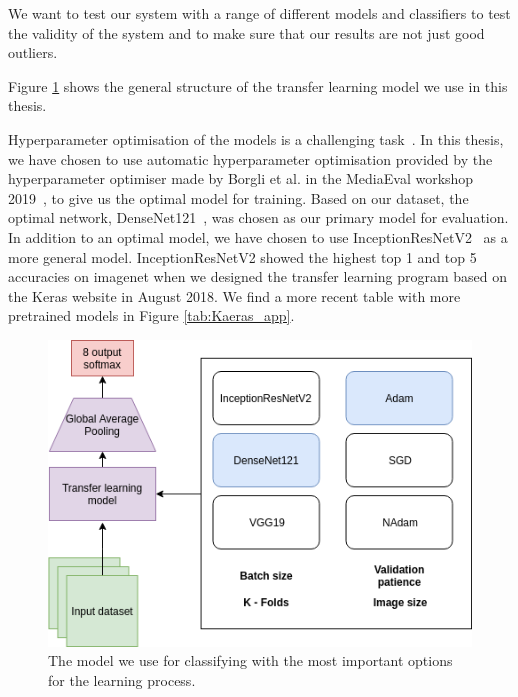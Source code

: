 We want to test our system with a range of different models and classifiers to test the validity of the system and to make sure that our results are not just good outliers.

Figure \ref{fig:KTLmodel} shows the general structure of the transfer learning model we use in this thesis. 

Hyperparameter optimisation of the models is a challenging task~\cite{runeMedico2018}. In this thesis, we have chosen to use automatic hyperparameter optimisation provided by the hyperparameter optimiser made by Borgli et al. in the MediaEval workshop 2019~\cite{runeMedico2018}, to give us the optimal model for training. Based on our dataset, the optimal network, DenseNet121~\cite{DBLP:journals/corr/HuangLW16a}, was chosen as our primary model for evaluation. 
In addition to an optimal model, we have chosen to use InceptionResNetV2~\cite{DBLP:journals/corr/SzegedyIV16} as a more general model. InceptionResNetV2 showed the highest top 1 and top 5 accuracies on imagenet when we designed the transfer learning program based on the Keras website in August 2018. We find a more recent table with more pretrained models in Figure \ref{tab:Kaeras_app}.





\begin{figure}[h]
        \centering
        \includegraphics[scale=0.5]{methodology/figures/model.png}
        \caption{ The model we use for classifying with the most important options for the learning process. }
    \label{fig:KTLmodel}
\end{figure}



